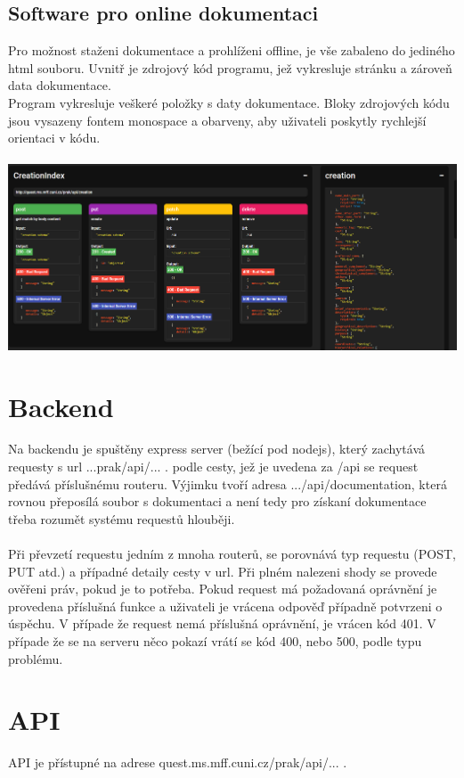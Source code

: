\subsection{Software pro online dokumentaci}
Pro možnost staženi dokumentace a prohlíženi offline, je vše zabaleno do jediného html souboru.
Uvnitř je zdrojový kód programu, jež vykresluje stránku a zároveň data dokumentace.
\\
Program vykresluje veškeré položky s daty dokumentace.
Bloky zdrojových kódu jsou vysazeny fontem monospace a obarveny, aby uživateli
poskytly rychlejší orientaci v kódu.
\\\\
\includegraphics[width=\textwidth]{img/documentationPreview.PNG}


\section{Backend}
Na backendu je spuštěny express server (bežící pod nodejs), který
zachytává requesty s url ...prak/api/... .
podle cesty, jež je uvedena za /api se request předává
příslušnému routeru. Výjimku tvoří adresa .../api/documentation, která
rovnou přeposílá soubor s dokumentaci a není tedy pro získaní dokumentace
třeba rozumět systému requestů hlouběji.
\\
\\
Při převzetí requestu jedním z mnoha routerů, se porovnává
typ requestu (POST, PUT atd.) a případné detaily cesty v url.
Při plném nalezeni shody se provede ověřeni práv, pokud je to potřeba.
Pokud request má požadovaná oprávnění je provedena příslušná funkce
a uživateli je vrácena odpověď případně potvrzeni o úspěchu.
V případe že request nemá příslušná oprávnění, je vrácen kód 401.
V případe že se na serveru něco pokazí vrátí se kód 400, nebo 500, podle typu problému.

\section{API}
API je přístupné na adrese quest.ms.mff.cuni.cz/prak/api/... .

